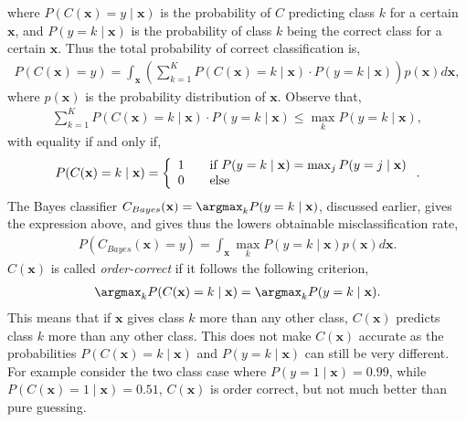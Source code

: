 where $P(C(\mathbf{x})=y \mid \mathbf{x})$ is the probability of $C$ predicting class $k$ for a certain $\mathbf{x}$, and $P(y=k \mid \mathbf{x})$ is the probability of class $k$ being the correct class for a certain $\mathbf{x}$. Thus the total probability of correct classification is,
\begin{align}
  P(C(\mathbf{x}) = y) = \int_{\mathbf{x}} \left(\sum^{K}_{k=1} P(C(\mathbf{x}) = k \mid \mathbf{x}) \cdot P(y=k \mid \mathbf{x})   \right) p(\mathbf{x}) d\mathbf{x},
\end{align}
where $p(\mathbf{x})$ is the probability distribution of $\mathbf{x}$. Observe that, 
\begin{align}
  \sum^{K}_{k=1} P(C(\mathbf{x}) = k \mid \mathbf{x}) \cdot P(y=k \mid \mathbf{x}) \leq \max_k P(y = k \mid \mathbf{x}),
\end{align}
with equality if and only if,
\begin{align}
  P(C(\mathbf{x}) = k \mid \mathbf{x}) = \left\{ 
  \begin{array}{l l}
    1 & \quad \text{if } P(y = k \mid \mathbf{x}) = \max_j P(y = j \mid \mathbf{x})\\
    0 & \quad \text{else}
  \end{array} \right. .
\end{align}
The Bayes classifier $C_{Bayes}(\mathbf{x}) = \argmax_k P(y = k \mid \mathbf{x})$, discussed earlier, gives the expression above, and gives thus the lowers obtainable misclassification rate,
\begin{align}
  \label{eq:bayesBagg} 
  P(C_{Bayes}(\mathbf{x}) = y) = \int_{\mathbf{x}} \max_k P(y=k \mid \mathbf{x})  p(\mathbf{x}) d\mathbf{x}.
\end{align}
$C(\mathbf{x})$ is called \textit{order-correct} if it follows the following criterion,
\begin{align}
  \argmax_k P(C(\mathbf{x}) = k \mid \mathbf{x}) = \argmax_k  P(y = k \mid \mathbf{x}).
\end{align}
This means that if $\mathbf{x}$ gives class $k$ more than any other class, $C(\mathbf{x})$ predicts class $k$ more than any other class. This does not make $C(\mathbf{x})$ accurate as the probabilities $P(C(\mathbf{x}) = k \mid \mathbf{x}) $ and $P(y = k \mid \mathbf{x})$ can still be very different. For example consider the two class case where $P(y = 1 \mid \mathbf{x})  = 0.99$, while $P(C(\mathbf{x}) = 1\mid \mathbf{x}) = 0.51$, $C(\mathbf{x})$ is order correct, but not much better than pure guessing.

